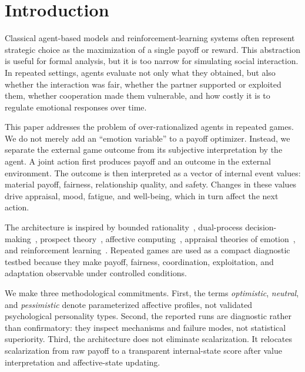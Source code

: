 \documentclass[runningheads]{llncs}
\begin{document}
\section{Introduction}

Classical agent-based models and reinforcement-learning systems often represent strategic choice as the maximization of a single payoff or reward. This abstraction is useful for formal analysis, but it is too narrow for simulating social interaction. In repeated settings, agents evaluate not only what they obtained, but also whether the interaction was fair, whether the partner supported or exploited them, whether cooperation made them vulnerable, and how costly it is to regulate emotional responses over time.

This paper addresses the problem of over-rationalized agents in repeated games. We do not merely add an ``emotion variable'' to a payoff optimizer. Instead, we separate the external game outcome from its subjective interpretation by the agent. A joint action first produces payoff and an outcome in the external environment. The outcome is then interpreted as a vector of internal event values: material payoff, fairness, relationship quality, and safety. Changes in these values drive appraisal, mood, fatigue, and well-being, which in turn affect the next action.

The architecture is inspired by bounded rationality~\cite{simon1955behavioral}, dual-process decision-making~\cite{kahneman2011thinking}, prospect theory~\cite{kahneman1979prospect}, affective computing~\cite{picard1997affective}, appraisal theories of emotion~\cite{ortony1988cognitive,marsella2009ema}, and reinforcement learning~\cite{sutton2018reinforcement,mnih2015human}. Repeated games are used as a compact diagnostic testbed because they make payoff, fairness, coordination, exploitation, and adaptation observable under controlled conditions.

We make three methodological commitments. First, the terms \emph{optimistic}, \emph{neutral}, and \emph{pessimistic} denote parameterized affective profiles, not validated psychological personality types. Second, the reported runs are diagnostic rather than confirmatory: they inspect mechanisms and failure modes, not statistical superiority. Third, the architecture does not eliminate scalarization. It relocates scalarization from raw payoff to a transparent internal-state score after value interpretation and affective-state updating.
\end{document}
